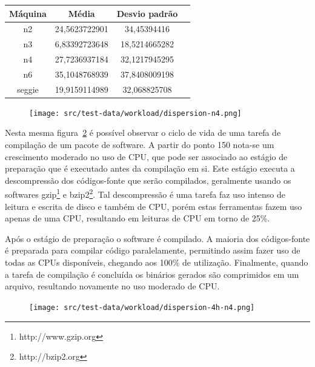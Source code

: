 \begin{table}[htp]
\centering
\hspace{-2cm} %
\label{quadro:desviopadrao}
\begin{tabular}{| c | c | c | c |}
\hline
Máquina & Média & Desvio padrão \\
\hline
n2 	& 	24,5623722901 & 34,45394416 \\
n3 	& 	6,83392723648 & 18,5214665282 \\
n4 	& 	27,7236937184 & 32,1217945295 \\
n6 	& 	35,1048768939 & 37,8408009198 \\
seggie 	&	19,9159114989 & 32,068825708 \\
\hline
\end{tabular}
\end{table}

\begin{figure}
\centering
\texttt{[image: src/test-data/workload/dispersion-n4.png]}
\label{fig:predispn4}
\end{figure}

Nesta mesma figura~\ref{fig:disp4hn4} é possível observar o ciclo de vida
de uma tarefa de compilação de um pacote de software. A partir do ponto 150
nota-se um crescimento moderado no uso de CPU, que pode ser associado ao
estágio de preparação que é executado antes da compilação em si. Este
estágio executa a descompressão dos códigos-fonte que serão compilados,
geralmente usando os softwares gzip\footnote{http://www.gzip.org} e
bzip2\footnote{http://bzip2.org}. Tal descompressão é uma tarefa faz uso
intenso de leitura e escrita de disco e também de CPU, porém estas
ferramentas fazem uso apenas de uma CPU, resultando em leituras de CPU em
torno de 25\%.

Após o estágio de preparação o software é compilado. A maioria dos
códigos-fonte é preparada para compilar código paralelamente, permitindo
assim fazer uso de todas as CPUs disponíveis, chegando aos 100\% de
utilização. Finalmente, quando a tarefa de compilação é concluída os
binários gerados são comprimidos em um arquivo, resultando novamente no uso
moderado de CPU.

\begin{figure}[htp]
\centering
\texttt{[image: src/test-data/workload/dispersion-4h-n4.png]}
\label{fig:disp4hn4}
\end{figure}


